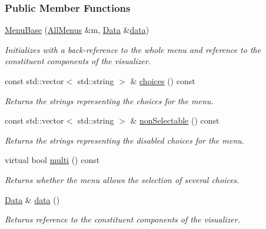 \subsubsection*{Public Member Functions}
\begin{DoxyCompactItemize}
\item 
\hyperlink{structslb_1_1core_1_1ui_1_1MenuBase_ab3e3534c24d4fe85425ffdbd26d99800}{Menu\+Base} (\hyperlink{structslb_1_1core_1_1ui_1_1AllMenus}{All\+Menus} \&m, \hyperlink{structslb_1_1core_1_1ui_1_1MenuBase_a1803444111552d2e5b87671292dd74cb}{Data} \&\hyperlink{structslb_1_1core_1_1ui_1_1MenuBase_a475d9457affb2b4fc96737e269d6911f}{data})
\begin{DoxyCompactList}\small\item\em Initializes with a back-\/reference to the whole menu and reference to the constituent components of the visualizer. \end{DoxyCompactList}\item 
const std\+::vector$<$ std\+::string $>$ \& \hyperlink{structslb_1_1core_1_1ui_1_1MenuBase_aa1df75c9c0208448f3a2e5551207894a}{choices} () const 
\begin{DoxyCompactList}\small\item\em Returns the strings representing the choices for the menu. \end{DoxyCompactList}\item 
const std\+::vector$<$ std\+::string $>$ \& \hyperlink{structslb_1_1core_1_1ui_1_1MenuBase_ad8625e43a539491f1b8adeedcfaa5c9f}{non\+Selectable} () const 
\begin{DoxyCompactList}\small\item\em Returns the strings representing the disabled choices for the menu. \end{DoxyCompactList}\item 
virtual bool \hyperlink{structslb_1_1core_1_1ui_1_1MenuBase_abfe98b881efe7a8c90d06585e8108388}{multi} () const 
\begin{DoxyCompactList}\small\item\em Returns whether the menu allows the selection of several choices. \end{DoxyCompactList}\item 
\hyperlink{structslb_1_1core_1_1ui_1_1MenuBase_a1803444111552d2e5b87671292dd74cb}{Data} \& \hyperlink{structslb_1_1core_1_1ui_1_1MenuBase_a475d9457affb2b4fc96737e269d6911f}{data} ()
\begin{DoxyCompactList}\small\item\em Returns reference to the constituent components of the visualizer. \end{DoxyCompactList}\item 

\end{DoxyCompactItemize}
